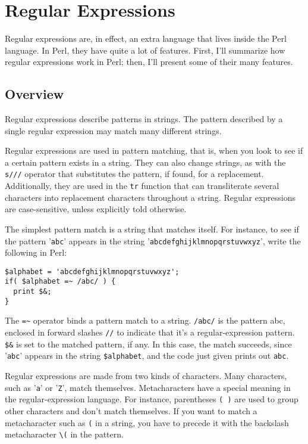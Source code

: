 \section{Regular Expressions}
Regular expressions are, in effect, an extra language that lives inside the Perl language. In Perl, they have quite a lot of features. First, I'll summarize how regular expressions work in Perl; then, I'll present some of their many features.

\subsection{Overview}
Regular expressions describe patterns in strings. The pattern described by a single regular expression may match many different strings.

Regular expressions are used in pattern matching, that is, when you look to see if a certain pattern exists in a string. They can also change strings, as with the \verb|s///| operator that substitutes the pattern, if found, for a replacement. Additionally, they are used in the \verb|tr| function that can transliterate several characters into replacement characters throughout a string. Regular expressions are case-sensitive, unless explicitly told otherwise.

The simplest pattern match is a string that matches itself. For instance, to see if the pattern '\verb|abc|' appears in the string '\verb|abcdefghijklmnopqrstuvwxyz|', write the following in Perl:

\begin{lstlisting}
$alphabet = 'abcdefghijklmnopqrstuvwxyz';
if( $alphabet =~ /abc/ ) {
  print $&;
}
\end{lstlisting}

The \verb|=~| operator binds a pattern match to a string. \verb|/abc/| is the pattern abc, enclosed in forward slashes \verb|//| to indicate that it's a regular-expression pattern. \verb|$&| is set to the matched pattern, if any. In this case, the match succeeds, since '\verb|abc|' appears in the string \verb|$alphabet|, and the code just given prints out \verb|abc|.

Regular expressions are made from two kinds of characters. Many characters, such as '\verb|a|' or '\verb|Z|', match themselves. Metacharacters have a special meaning in the regular-expression language. For instance, parentheses \verb|( )| are used to group other characters and don't match themselves. If you want to match a metacharacter such as \verb|(| in a string, you have to precede it with the backslash metacharacter \verb|\(| in the pattern.

